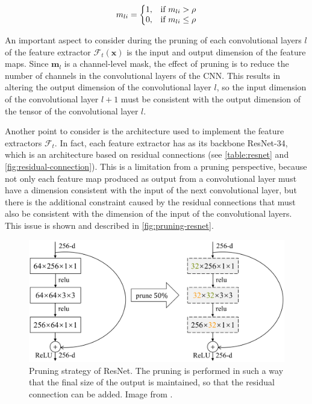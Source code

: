 \begin{align*}
    m_{li}&=\left\{
        \begin{array}{@{}ll@{}}
            1, & \text{if } m_{li} > \rho\\
            0, & \text{if } m_{li} \leq \rho\\
        \end{array}\right.\\
\end{align*}

An important aspect to consider during the pruning of each convolutional layers $l$ of the feature extractor $\mathcal{F}_t(\mathbf{x})$ is the input and output dimension of the feature maps.
Since $\mathbf{m}_l$ is a channel-level mask, the effect of pruning is to reduce the number of channels in the convolutional layers of the CNN.
This results in altering the output dimension of the convolutional layer $l$, so the input dimension of the convolutional layer $l+1$ must be consistent with the output dimension of the tensor of the convolutional layer $l$.

Another point to consider is the architecture used to implement the feature extractors $\mathcal{F}_t$. In fact, each feature extractor has as its backbone ResNet-34, which is an architecture based on residual connections (see \autoref{table:resnet} and \autoref{fig:residual-connection}).
This is a limitation from a pruning perspective, because not only each feature map produced as output from a convolutional layer must have a dimension consistent with the input of the next convolutional layer, but there is the additional constraint caused by the residual connections that must also be consistent with the dimension of the input of the convolutional layers. This issue is shown and described in \autoref{fig:pruning-resnet}.


\begin{figure}[H]
    \begin{center}
        \includegraphics[width=\columnwidth]{images/resnet-pruning.png}
    \end{center}
    \caption{Pruning strategy of ResNet. The pruning is performed in such a way that the final size of the output is maintained, so that the residual connection can be added. Image from \cite{8416559}.}
    \label{fig:pruning-resnet}
\end{figure}

